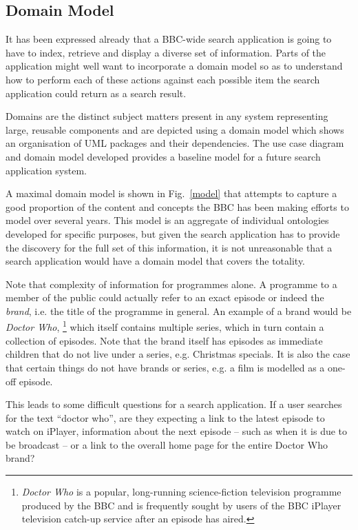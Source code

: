 \documentclass{llncs}
\begin{document}
\subsection{Domain Model}

It has been expressed already that a BBC-wide search application
is going to have to index, retrieve and display a diverse set of
information. Parts of the application might well want to incorporate
a domain model\cite{fowler2002patterns} so as to understand how
to perform each of these actions against each possible item
the search application could return as a search result.

Domains are the distinct subject matters present in any system
representing large, reusable components and are depicted using a
domain model which shows an organisation of UML packages and their
dependencies\cite{dickerson2009architecture}. The use case diagram and domain model
developed provides a baseline model for a future search application system.

A maximal
domain model is shown in Fig.~\ref{model} that attempts to capture
a good proportion of the content and concepts the BBC has
been making efforts to model over several years. This model is
an aggregate of individual ontologies developed for specific purposes,
but given the search application has to provide the discovery for
the full set of this information, it is not unreasonable that
a search application would have a domain model that covers the totality.

Note that complexity of information for programmes alone\cite{raimond2009bbc}.
A programme to a member of the public could actually refer to an
exact episode or indeed the \emph{brand}, i.e. the title of the programme
in general. An example of a brand would be
\emph{Doctor Who},
\footnote{\emph{Doctor Who} is a popular, long-running science-fiction
television programme produced by the BBC and is frequently sought by users
of the BBC iPlayer television catch-up service after an episode has aired.
} which itself contains multiple series, which in turn
contain a collection of episodes. Note that the brand itself has episodes
as immediate children that do not live under a series, e.g. Christmas specials.
It is also the case that certain things do not have brands or series, e.g.
a film is modelled as a one-off episode.

This leads to some difficult questions for a search application. If a user
searches for the text ``doctor who'',
are they expecting a link to the
latest episode to watch on iPlayer, information about the next episode
-- such as when it is due to be broadcast -- or a link to the overall
home page for the entire Doctor Who brand?
\end{document}

